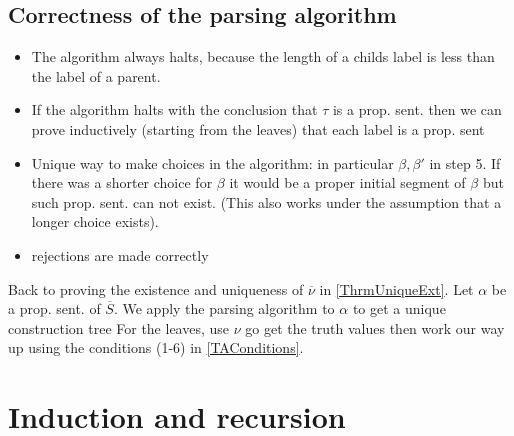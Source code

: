 \subsection*{Correctness of the parsing algorithm}
\begin{itemize}
    \item The algorithm always halts, because the length of a childs label is less than the label of a parent.
    \item If the algorithm halts with the conclusion that $\tau$ is a prop. sent. 
    then we can prove inductively (starting from the leaves) that each label is a prop. sent
    \item Unique way to make choices in the algorithm: in particular $\beta, \beta'$ in step 5.
    If there was a shorter choice for $\beta$ it would be a proper initial segment of $\beta$ but such prop. sent. can not exist.
    (This also works under the assumption that a longer choice exists).
    \item rejections are made correctly
\end{itemize}

Back to proving the existence and uniqueness of $\overline{\nu}$ in \ref{ThrmUniqueExt}.
Let $\alpha$ be a prop. sent. of $\overline{S}$. We apply the parsing algorithm to $\alpha$ to get a unique construction tree
For the leaves, use $\nu$ go get the truth values then work our way up using the conditions (1-6) in \ref{TAConditions}.
\section{Induction and recursion}

